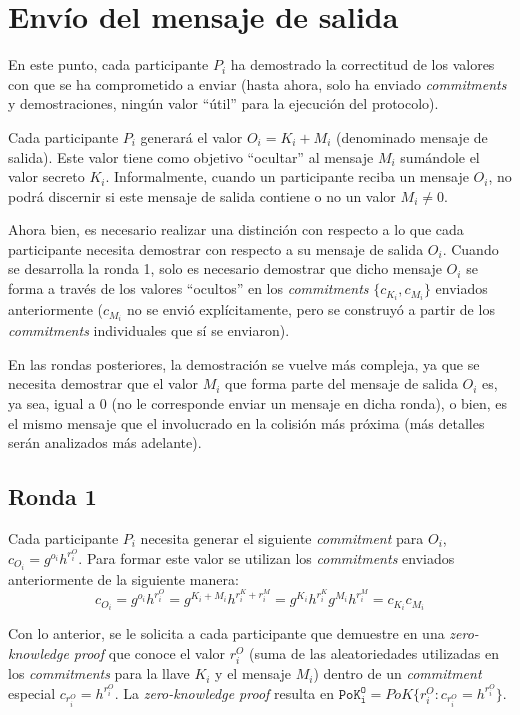 \section{Envío del mensaje de salida}

En este punto, cada participante $P_i$ ha demostrado la correctitud de los valores 
con que se ha comprometido a enviar (hasta ahora, solo ha enviado \emph{commitments} 
y demostraciones, ningún valor ``útil'' para la ejecución del protocolo).

Cada participante $P_i$ generará el valor $O_i = K_i + M_i$ (denominado mensaje de salida). 
Este valor tiene como objetivo ``ocultar'' al mensaje $M_i$ sumándole el valor 
secreto $K_i$. Informalmente, cuando un participante reciba un mensaje $O_i$, no podrá 
discernir si este mensaje de salida contiene o no un valor $M_i \neq 0$.

Ahora bien, es necesario realizar una distinción con respecto a lo que cada participante 
necesita demostrar con respecto a su mensaje de salida $O_i$. Cuando se desarrolla la 
ronda 1, solo es necesario demostrar que dicho mensaje $O_i$ se forma a través de los 
valores ``ocultos'' en los \emph{commitments} $\{c_{K_i}, c_{M_i}\}$ enviados anteriormente 
($c_{M_i}$ no se envió explícitamente, pero se construyó a partir de los \emph{commitments} 
individuales que sí se enviaron).

En las rondas posteriores, la demostración se vuelve más compleja, ya que se necesita 
demostrar que el valor $M_i$ que forma parte del mensaje de salida $O_i$ es, ya sea, igual 
a 0 (no le corresponde enviar un mensaje en dicha ronda), o bien, es el mismo mensaje que 
el involucrado en la colisión más próxima (más detalles serán analizados más adelante).

\subsection{Ronda 1}

Cada participante $P_i$ necesita generar el siguiente \emph{commitment} para 
$O_i$, $c_{O_i} = g^{o_i} h^{r_i^O}$. Para formar este valor se utilizan los \emph{commitments} 
enviados anteriormente de la siguiente manera: 
$$c_{O_i} = g^{o_i} h^{r_i^O} = g^{K_i + M_i} h^{r_i^K + r_i^M} = g^{K_i} h^{r_i^K} g^{M_i} h^{r_i^M} = c_{K_i} c_{M_i}$$

Con lo anterior, se le solicita a cada participante que demuestre en una \emph{zero-knowledge proof} 
que conoce el valor $r_i^O$ (suma de las aleatoriedades utilizadas en los 
\emph{commitments} para la llave $K_i$ y el mensaje $M_i$) dentro de un \emph{commitment} 
especial $c_{r_i^O} = h^{r_i^O}$. La \emph{zero-knowledge proof} resulta en 
$\mathtt{PoK_i^O} = PoK\{r_i^O : c_{r_i^O} = h^{r_i^O}\}$.

